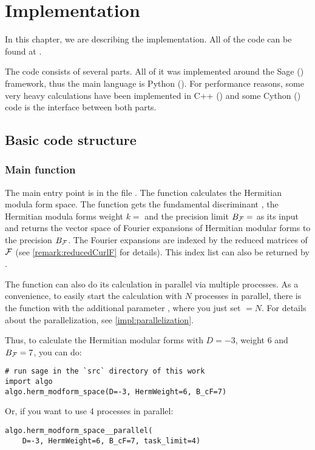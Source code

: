
\section{Implementation}

In this chapter, we are describing the implementation. All of the code can be found at \cite{Zeyer13Github}.

The code consists of several parts.
All of it was implemented around the Sage (\cite{sage}) framework, thus the main language is Python (\cite{python}).
For performance reasons, some very heavy calculations have been implemented in C++ (\cite{cpp}) and some Cython (\cite{cython}) code is the interface between both parts.

\subsection{Basic code structure}

\subsubsection{Main function }
The main entry point is in the file .
The function  calculates the Hermitian modula form space.
The function gets the fundamental discriminant , the Hermitian modula forms weight $k =$  and the precision limit $B_{\mathcal{F}} =$  as its input and returns the vector space of Fourier expansions of Hermitian modular forms to the precision $B_{\mathcal{F}}$. The Fourier expansions are indexed by the reduced matrices of $\mathcal{F}$ (see \cref{remark:reducedCurlF} for details). This index list can also be returned by .

The function can also do its calculation in parallel via multiple processes. As a convenience, to easily start the calculation with $N$ processes in parallel, there is the function  with the additional parameter , where you just set  $=N$. For details about the parallelization, see \cref{impl:parallelization}.

Thus, to calculate the Hermitian modular forms with $D=-3$, weight $6$ and $B_{\mathcal{F}} = 7$, you can do:
\begin{lstlisting}
# run sage in the `src` directory of this work
import algo
algo.herm_modform_space(D=-3, HermWeight=6, B_cF=7)
\end{lstlisting}
Or, if you want to use 4 processes in parallel:
\begin{lstlisting}
algo.herm_modform_space__parallel(
    D=-3, HermWeight=6, B_cF=7, task_limit=4)
\end{lstlisting}

